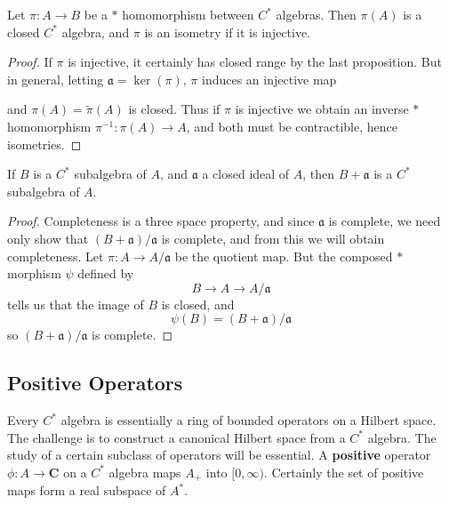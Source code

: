 \begin{corollary}
    Let $\pi: A \to B$ be a $*$ homomorphism between $C^*$ algebras. Then $\pi(A)$ is a closed $C^*$ algebra, and $\pi$ is an isometry if it is injective.
\end{corollary}
\begin{proof}
    If $\pi$ is injective, it certainly has closed range by the last proposition. But in general, letting $\mathfrak{a} = \ker(\pi)$, $\pi$ induces an injective map
    \begin{center}
    \end{center}
    and $\pi(A) = \tilde{\pi}(A)$ is closed. Thus if $\pi$ is injective we obtain an inverse $*$ homomorphism $\pi^{-1}: \pi(A) \to A$, and both must be contractible, hence isometries.
\end{proof}

\begin{prop}
    If $B$ is a $C^*$ subalgebra of $A$, and $\mathfrak{a}$ a closed ideal of $A$, then $B + \mathfrak{a}$ is a $C^*$ subalgebra of $A$.
\end{prop}
\begin{proof}
    Completeness is a three space property, and since $\mathfrak{a}$ is complete, we need only show that $(B + \mathfrak{a})/\mathfrak{a}$ is complete, and from this we will obtain completeness. Let $\pi: A \to A/\mathfrak{a}$ be the quotient map. But the composed $*$ morphism $\psi$ defined by
    \[ B \to A \to A/\mathfrak{a} \]
    tells us that the image of $B$ is closed, and
    \[ \psi(B) = (B + \mathfrak{a})/\mathfrak{a} \]
    so $(B + \mathfrak{a})/\mathfrak{a}$ is complete.
\end{proof}




\subsection{Positive Operators}

Every $C^*$ algebra is essentially a ring of bounded operators on a Hilbert space. The challenge is to construct a canonical Hilbert space from a $C^*$ algebra. The study of a certain subclass of operators will be essential. A {\bf positive} operator $\phi: A \to \mathbf{C}$ on a $C^*$ algebra maps $A_+$ into $[0,\infty)$. Certainly the set of positive maps form a real subspace of $A^*$.

